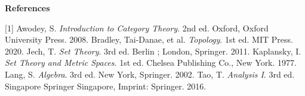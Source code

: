 \documentclass[10pt]{article}
\begin{document}
\vspace{\baselineskip}
\begin{center}
    \large\bfseries References\normalsize
\end{center}
[1] Awodey, S. \textit{Introduction to Category Theory}. 2nd ed. Oxford, Oxford University Press. 2008.
\newline
[2] Bradley, Tai-Danae, et al. \textit{Topology}. 1st ed. MIT Press. 2020.
\newline
[3] Jech, T. \textit{Set Theory}. 3rd ed. Berlin ; London, Springer. 2011.
\newline
[4] Kaplansky, I. \textit{Set Theory and Metric Spaces}. 1st ed. Chelsea Publishing Co., New York. 1977.
\newline
[5] Lang, S. \textit{Algebra}. 3rd ed. New York, Springer. 2002.
\newline
[6] Tao, T. \textit{Analysis I}. 3rd ed. Singapore Springer Singapore, Imprint: Springer. 2016.
\hindex 
\end{document}
